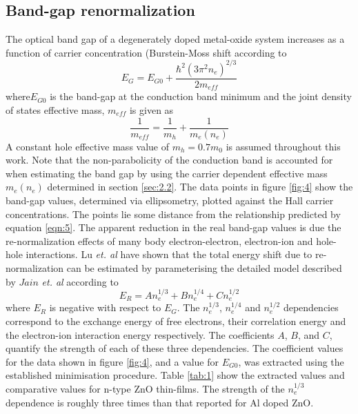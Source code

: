 \documentclass[aps,prl,preprint,showpacs,showkeys,linenumbers]{revtex4-1}
\begin{document}
\subsection{ Band-gap renormalization}
\label{sec:2.3}

The optical band gap of a degenerately doped metal-oxide system increases as a function of carrier concentration (Burstein-Moss shift \cite{Burstein1954,Moss1954} according to
\begin{equation}
\label{eqn:5}
E_G = E_{G0} + \frac{\hbar^2(3\pi^2n_e)^{2/3}}{2m_{eff}}
\end{equation}
where$E_{G0}$ is the band-gap at the conduction band minimum and the joint density of states effective mass, $m_{eff}$ is given as
\begin{equation}
\label{eqn:6}
\frac{1}{m_{eff}} = \frac{1}{m_h}+\frac{1}{m_e(n_e)}
\end{equation}
A constant hole effective mass value of $m_h = 0.7m_0$ \cite{} is assumed throughout this work. Note that the non-parabolicity of the conduction band is accounted for when estimating the band gap by using the carrier dependent effective mass $m_e(n_e)$ determined in section \ref{sec:2.2}. The data points in figure \ref{fig:4} show the band-gap values, determined via ellipsometry, plotted against the Hall carrier concentrations. The points lie some distance from the relationship predicted by equation \ref{eqn:5}. The apparent reduction in the real band-gap values is due the re-normalization effects of many body electron-electron, electron-ion and hole-hole interactions. Lu \textit{et. al} \cite{Lu2007} have shown that the total energy shift due to re-normalization can be estimated by parameterising the detailed model described by $Jain$ \textit{et. al} according to 
\begin{equation}
\label{eqn:7}
E_R = An_e^{1/3} + Bn_e^{1/4} + Cn_e^{1/2}
\end{equation}
where $E_R$ is negative with respect to $E_G$. The $n_e^{1/3}$, $n_e^{1/4}$ and $n_e^{1/2}$ dependencies correspond to the exchange energy of free electrons, their correlation energy and the electron-ion interaction energy respectively. The coefficients $A$, $B$, and $C$, quantify the strength of each of these three dependencies. The coefficient values for the data shown in figure \ref{fig:4}, and a value for $E_{G0}$, was extracted using the established minimisation procedure. Table \ref{tab:1} show the extracted values and comparative values for n-type ZnO thin-films. The strength of the $n_e^{1/3}$ dependence is roughly three times than that reported for Al doped ZnO.
\end{document}
